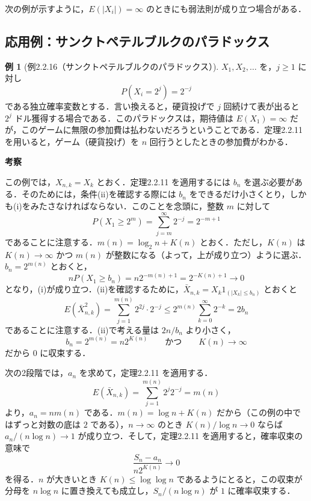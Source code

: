 \documentclass[dvipdfmx]{jsarticle}
\makeatletter
\numberwithin{equation}{section}
\theoremstyle{definition}
\newtheorem{ex}[thm]{例}
\renewenvironment{proof}[1][\proofname]{\par
  \pushQED{\qed}%
  \normalfont \topsep6\p@\@plus6\p@\relax
  \trivlist
  \item\relax
  {\bfseries
  #1\@addpunct{.}}\hspace\labelsep\ignorespaces
}{%
  \popQED\endtrivlist\@endpefalse
}
\renewcommand{\proofname}{証明}
\newcommand{\0}{\bm{0}}
\newcommand{\1}{\bm{1}}
\makeatother
\begin{document}
次の例が示すように，$E(|X_i|) = \infty$ のときにも弱法則が成り立つ場合がある．

\subsection{応用例：サンクトペテルブルクのパラドックス}

\begin{ex}[例2.2.16（サンクトペテルブルクのパラドックス）]
$X_1, X_2, \dots$ を，$j \ge 1$ に対し
\[
  P(X_i = 2^j) = 2^{-j}
\]
である独立確率変数とする．言い換えると，硬貨投げで $j$ 回続けて表が出ると $2^j$ ドル獲得する場合である．このパラドックスは，期待値は $E(X_1) = \infty$ だが，このゲームに無限の参加費は払わないだろうということである．定理2.2.11 を用いると，ゲーム（硬貨投げ）を $n$ 回行うとしたときの参加費がわかる．
\end{ex}

\begin{proof}[考察]
この例では，$X_{n,k} = X_k$ とおく．定理2.2.11 を適用するには $b_n$ を選ぶ必要がある．そのためには，条件(ii)を確認する際には $b_n$ をできるだけ小さくとり，しかも(i)をみたさなければならない．このことを念頭に，整数 $m$ に対して
\[
  P(X_1 \ge 2^m) = \sum_{j=m}^\infty 2^{-j} = 2^{-m+1}
\]
であることに注意する．$m(n) = \log_2 n + K(n)$ とおく．ただし，$K(n)$ は $K(n) \to \infty$ かつ $m(n)$ が整数になる（よって，上が成り立つ）ように選ぶ．$b_n = 2^{m(n)}$ とおくと，
\[
  nP(X_1 \ge b_n) = n 2^{-m(n)+1} = 2^{-K(n)+1} \to 0
\]
となり，(i)が成り立つ．(ii)を確認するために，$\bar{X}_{n,k} = X_k 1_{(|X_k| \le b_n)}$ とおくと
\[
  E(\bar{X}_{n,k}^2) = \sum_{j=1}^{m(n)} 2^{2j} \cdot 2^{-j} \le 2^{m(n)} \sum_{k=0}^\infty 2^{-k} = 2b_n
\]
であることに注意する．(ii)で考える量は $2n/b_n$ より小さく，
\[
  b_n = 2^{m(n)} = n 2^{K(n)} \qquad \text{かつ} \qquad K(n) \to \infty
\]
だから $0$ に収束する．

次の2段階では，$a_n$ を求めて，定理2.2.11 を適用する．
\[
  E(\bar{X}_{n,k}) = \sum_{j=1}^{m(n)} 2^j 2^{-j} = m(n)
\]
より，$a_n = n m(n)$ である．$m(n) = \log n + K(n)$ だから（この例の中ではずっと対数の底は $2$ である），$n \to \infty$ のとき $K(n)/\log n \to 0$ ならば $a_n/(n\log n) \to 1$ が成り立つ．そして，定理2.2.11 を適用すると，確率収束の意味で
\[
  \frac{S_n - a_n}{n 2^{K(n)}} \to 0
\]
を得る．$n$ が大きいとき $K(n) \le \log\log n$ であるようにとると，この収束が分母を $n\log n$ に置き換えても成立し，$S_n/(n\log n)$ が $1$ に確率収束する．
\end{proof}
\end{document}
